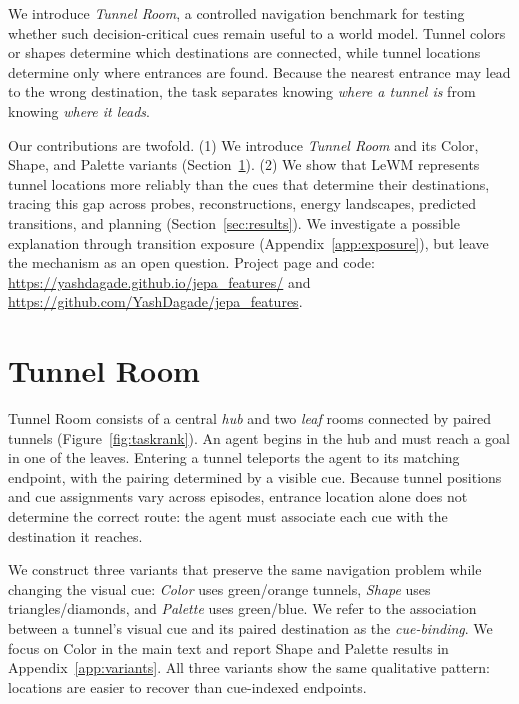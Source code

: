 \documentclass{article}
\begin{document}
We introduce \emph{Tunnel Room}, a controlled navigation benchmark for testing whether such decision-critical cues remain useful to a world model. Tunnel colors or shapes determine which destinations are connected, while tunnel locations determine only where entrances are found. Because the nearest entrance may lead to the wrong destination, the task separates knowing \emph{where a tunnel is} from knowing \emph{where it leads}.

Our contributions are twofold. (1) We introduce \emph{Tunnel Room} and its Color, Shape, and Palette variants (Section~\ref{sec:benchmark}). (2) We show that LeWM represents tunnel locations more reliably than the cues that determine their destinations, tracing this gap across probes, reconstructions, energy landscapes, predicted transitions, and planning (Section~\ref{sec:results}). We investigate a possible explanation through transition exposure (Appendix~\ref{app:exposure}), but leave the mechanism as an open question. Project page and code: \url{https://yashdagade.github.io/jepa_features/} and \mbox{\url{https://github.com/YashDagade/jepa_features}}.

\section{Tunnel Room}
\label{sec:benchmark}

Tunnel Room consists of a central \emph{hub} and two \emph{leaf} rooms connected by paired tunnels (Figure~\ref{fig:taskrank}). An agent begins in the hub and must reach a goal in one of the leaves. Entering a tunnel teleports the agent to its matching endpoint, with the pairing determined by a visible cue. Because tunnel positions and cue assignments vary across episodes, entrance location alone does not determine the correct route: the agent must associate each cue with the destination it reaches.

We construct three variants that preserve the same navigation problem while changing the visual cue: \emph{Color} uses green/orange tunnels, \emph{Shape} uses triangles/diamonds, and \emph{Palette} uses green/blue. We refer to the association between a tunnel's visual cue and its paired destination as the \emph{cue-binding}. We focus on Color in the main text and report Shape and Palette results in Appendix~\ref{app:variants}. All three variants show the same qualitative pattern: locations are easier to recover than cue-indexed endpoints.
\end{document}
